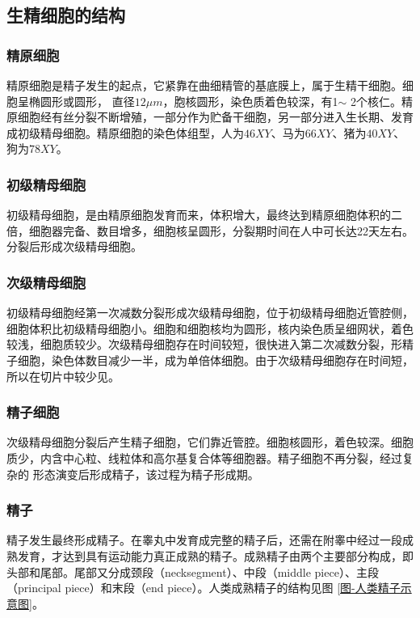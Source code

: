 \subsection{生精细胞的结构}

\subsubsection{精原细胞}

精原细胞是精子发生的起点，它紧靠在曲细精管的基底膜上，属于生精干细胞。细胞呈椭圆形或圆形， 直径$ 12\mu m $，胞核圆形，染色质着色较深，有1$ \sim $ 2个核仁。精原细胞经有丝分裂不断增殖，一部分作为贮备干细胞，另一部分进入生长期、发育成初级精母细胞。精原细胞的染色体组型，人为$ 46XY $、马为$ 66XY $、猪为$ 40XY $、狗为$ 78XY $。

\subsubsection{初级精母细胞}

初级精母细胞，是由精原细胞发育而来，体积增大，最终达到精原细胞体积的二倍，细胞器完备、数目增多，细胞核呈圆形，分裂期时间在人中可长达22天左右。分裂后形成次级精母细胞。

\subsubsection{次级精母细胞}

初级精母细胞经第一次减数分裂形成次级精母细胞，位于初级精母细胞近管腔侧，细胞体积比初级精母细胞小。细胞和细胞核均为圆形，核内染色质呈细网状，着色 较浅，细胞质较少。次级精母细胞存在时间较短，很快进入第二次减数分裂，形精子细胞，染色体数目减少一半，成为单倍体细胞。由于次级精母细胞存在时间短，所以在切片中较少见。

\subsubsection{精子细胞}
次级精母细胞分裂后产生精子细胞，它们靠近管腔。细胞核圆形，着色较深。细胞 质少，内含中心粒、线粒体和高尔基复合体等细胞器。精子细胞不再分裂，经过复杂的 形态演变后形成精子，该过程为精子形成期。

\subsubsection{精子}

精子发生最终形成精子。在睾丸中发育成完整的精子后，还需在附睾中经过一段成熟发育，才达到具有运动能力真正成熟的精子。成熟精子由两个主要部分构成，即头部和尾部。尾部又分成颈段（necksegment）、中段（middle piece）、主段（principal piece）和末段（end piece）。人类成熟精子的结构见图 \ref{图-人类精子示意图}。

